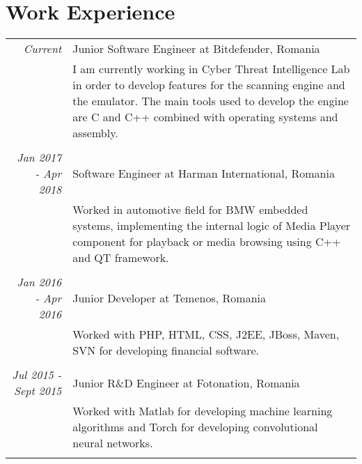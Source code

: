 \documentclass[a4paper,10pt]{article} %
\begin{document}

\section{Work Experience}
\begin{tabular}{r|p{11cm}}

\emph{Current} & Junior Software Engineer at Bitdefender, Romania \\
& \footnotesize{I am currently working in Cyber Threat Intelligence Lab in order to develop features for the scanning engine and the emulator. The main tools used to develop the engine are C and C++ combined with operating systems and assembly.}\\
\multicolumn{2}{c}{} \\


\emph{Jan 2017 - Apr 2018} & Software Engineer at Harman International, Romania \\
& \footnotesize{Worked in automotive field for BMW embedded systems, implementing the internal logic of Media Player component for playback or media browsing using C++ and QT framework.}\\
\multicolumn{2}{c}{} \\


\emph{Jan 2016 - Apr 2016} & Junior Developer at Temenos, Romania \\
& \footnotesize{Worked with PHP, HTML, CSS, J2EE, JBoss, Maven, SVN for developing financial software.}\\
\multicolumn{2}{c}{} \\


\emph{Jul 2015 - Sept 2015} & Junior R\&D Engineer at Fotonation, Romania \\
& \footnotesize{Worked with Matlab for developing machine learning algorithms and Torch for developing convolutional neural networks.}\\
\multicolumn{2}{c}{} \\



\end{tabular}
\end{document}
